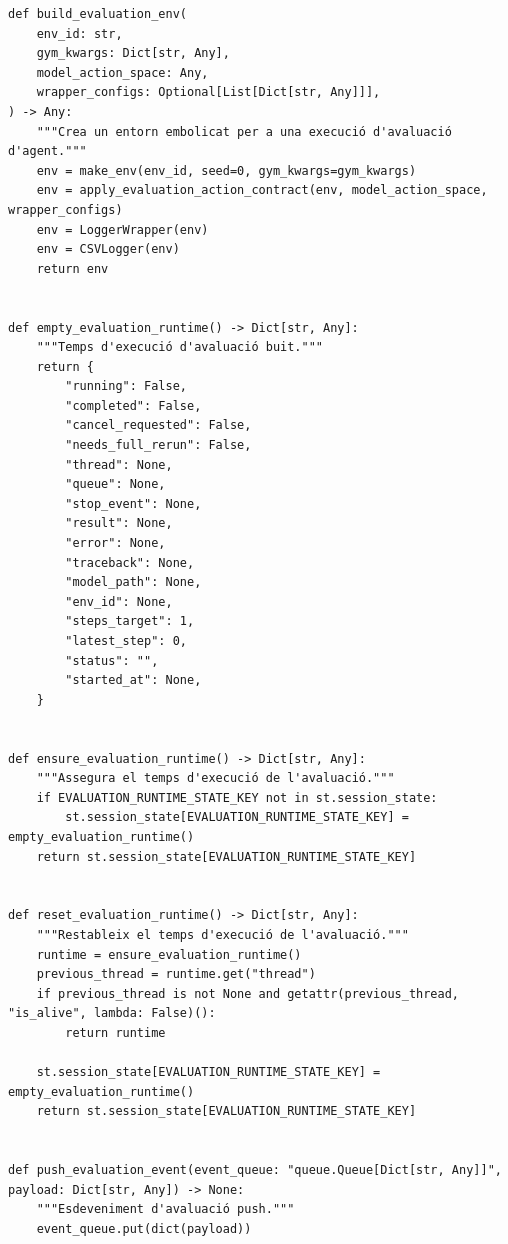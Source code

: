\documentclass[10pt,a4paper]{article}
\begin{document}
\begin{lstlisting}[style=studioPython,caption={backend/avaluar\_agent\_backend.py},label={lst:backend-avaluar-agent-backend-py}]
def build_evaluation_env(
    env_id: str,
    gym_kwargs: Dict[str, Any],
    model_action_space: Any,
    wrapper_configs: Optional[List[Dict[str, Any]]],
) -> Any:
    """Crea un entorn embolicat per a una execució d'avaluació d'agent."""
    env = make_env(env_id, seed=0, gym_kwargs=gym_kwargs)
    env = apply_evaluation_action_contract(env, model_action_space, wrapper_configs)
    env = LoggerWrapper(env)
    env = CSVLogger(env)
    return env


def empty_evaluation_runtime() -> Dict[str, Any]:
    """Temps d'execució d'avaluació buit."""
    return {
        "running": False,
        "completed": False,
        "cancel_requested": False,
        "needs_full_rerun": False,
        "thread": None,
        "queue": None,
        "stop_event": None,
        "result": None,
        "error": None,
        "traceback": None,
        "model_path": None,
        "env_id": None,
        "steps_target": 1,
        "latest_step": 0,
        "status": "",
        "started_at": None,
    }


def ensure_evaluation_runtime() -> Dict[str, Any]:
    """Assegura el temps d'execució de l'avaluació."""
    if EVALUATION_RUNTIME_STATE_KEY not in st.session_state:
        st.session_state[EVALUATION_RUNTIME_STATE_KEY] = empty_evaluation_runtime()
    return st.session_state[EVALUATION_RUNTIME_STATE_KEY]


def reset_evaluation_runtime() -> Dict[str, Any]:
    """Restableix el temps d'execució de l'avaluació."""
    runtime = ensure_evaluation_runtime()
    previous_thread = runtime.get("thread")
    if previous_thread is not None and getattr(previous_thread, "is_alive", lambda: False)():
        return runtime

    st.session_state[EVALUATION_RUNTIME_STATE_KEY] = empty_evaluation_runtime()
    return st.session_state[EVALUATION_RUNTIME_STATE_KEY]


def push_evaluation_event(event_queue: "queue.Queue[Dict[str, Any]]", payload: Dict[str, Any]) -> None:
    """Esdeveniment d'avaluació push."""
    event_queue.put(dict(payload))



\end{lstlisting}
\end{document}
